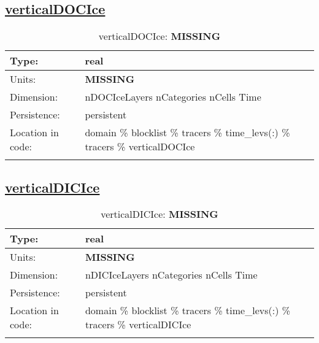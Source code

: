 \subsection[verticalDOCIce]{\hyperref[sec:var_tab_tracers]{verticalDOCIce}}
\label{subsec:var_sec_tracers_verticalDOCIce}
\begin{center}
\begin{longtable}{| p{2.0in} | p{4.0in} |}
        \hline 
        Type: & real \\
        \hline 
        Units: & {\bf \color{red} MISSING} \\
        \hline 
        Dimension: & nDOCIceLayers nCategories nCells Time \\
        \hline 
        Persistence: & persistent \\
        \hline 
         Location in code: & domain \% blocklist \% tracers \% time\_levs(:) \% tracers \% verticalDOCIce \\
         \hline 
    \caption{verticalDOCIce: {\bf \color{red} MISSING}}
\end{longtable}
\end{center}
\subsection[verticalDICIce]{\hyperref[sec:var_tab_tracers]{verticalDICIce}}
\label{subsec:var_sec_tracers_verticalDICIce}
\begin{center}
\begin{longtable}{| p{2.0in} | p{4.0in} |}
        \hline 
        Type: & real \\
        \hline 
        Units: & {\bf \color{red} MISSING} \\
        \hline 
        Dimension: & nDICIceLayers nCategories nCells Time \\
        \hline 
        Persistence: & persistent \\
        \hline 
         Location in code: & domain \% blocklist \% tracers \% time\_levs(:) \% tracers \% verticalDICIce \\
         \hline 
    \caption{verticalDICIce: {\bf \color{red} MISSING}}
\end{longtable}
\end{center}
